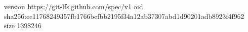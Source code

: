 version https://git-lfs.github.com/spec/v1
oid sha256:ee11768249357fb1766bcfbb2195f34a12ab37307abd1d90201adb8923f4f962
size 1398246
